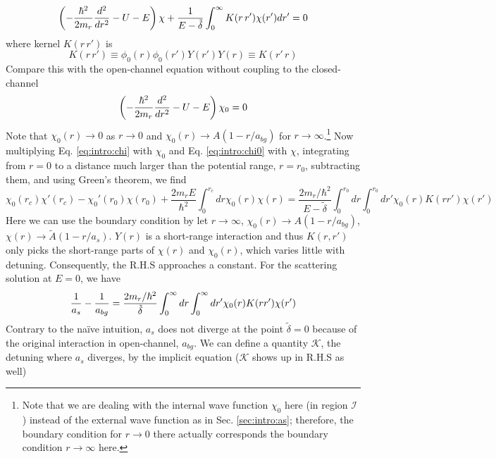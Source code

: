 \begin{equation}\label{eq:intro:chi}
\left(-\frac{\hbar^{2}}{2m_{r}}\frac{d^{2}}{dr^{2}}-U-E\right)\chi+\frac{1}{E-\tilde\delta}\int_{0}^{\infty}K(r\,r')\chi(r')dr'=0
\end{equation}
where kernel $K(r\,r')$ is
\begin{equation}\label{eq:intro:Krr}
K(r\,r')\equiv\phi_{0}(r)\phi_{0}(r')Y(r')Y(r)\equiv{}K(r'\,r)
\end{equation}
Compare this with the open-channel  \sch equation without coupling to the closed-channel
\begin{equation}\label{eq:intro:chi0}
\left(-\frac{\hbar^{2}}{2m_{r}}\frac{d^{2}}{dr^{2}}-U-E\right)\chi_{0}=0
\end{equation}
Note that $\chi_{0}(r)\rightarrow0$ as $r\rightarrow0$ and $\chi_{0}(r)\rightarrow{A}(1-r/a_{bg})$ for $r\rightarrow\infty$.\footnote{Note that we are dealing with the internal wave function $\chi_{0}$ here (in region $\mathcal{I}$) instead of the external wave function as in Sec. \ref{sec:intro:as}; therefore, the boundary condition for $r\rightarrow0$ there actually corresponds the boundary condition $r\rightarrow\infty$ here.} Now multiplying Eq. \ref{eq:intro:chi} with $\chi_{0}$ and Eq. \ref{eq:intro:chi0} with $\chi$, integrating from $r=0$ to a  distance much larger than the potential range, $r=r_{0}$, subtracting them, and using Green's theorem, we find 
\begin{equation}
\chi_{0}(r_{c})\chi'(r_{c})-\chi_{0}'(r_{0})\chi(r_{0})+\frac{2m_{r}E}{\hbar^{2}}\int_{0}^{r_{c}}dr\chi_{0}(r)\chi(r)
=\frac{2m_{r}/\hbar^{2}}{E-\tilde\delta}\int_{0}^{r_{0}}dr\int_{0}^{r_{0}}dr'\chi_{0}(r)K(rr')\chi(r')
\end{equation}
Here we can use the boundary condition by let $r\rightarrow\infty$, $\chi_{0}(r)\rightarrow{A}(1-r/a_{bg})$, $\chi(r)\rightarrow\tilde{A}(1-r/a_{s})$.  $Y(r)$ is a short-range interaction and thus $K(r,r')$ only picks the short-range parts of $\chi(r)$ and $\chi_{0}(r)$, which varies little with detuning. Consequently,  the R.H.S approaches a constant.  For the scattering solution at  $E=0$, we have 
\begin{equation}
\frac{1}{a_{s}}-\frac{1}{a_{bg}}=\frac{2m_{r}/\hbar^{2}}{\tilde\delta}\int_{0}^{\infty}dr\int_{0}^{\infty}dr'\chi_{0}(r)K(rr')\chi(r')
\end{equation}
Contrary to the na\"ive intuition, $a_{s}$ does not diverge at the point $\tilde\delta=0$ because of the original interaction in open-channel, $a_{bg}$.  We can define a quantity $\mathcal{K}$, the detuning where $a_{s}$ diverges, by the implicit equation ($\mathcal{K}$ shows up in R.H.S as well)
